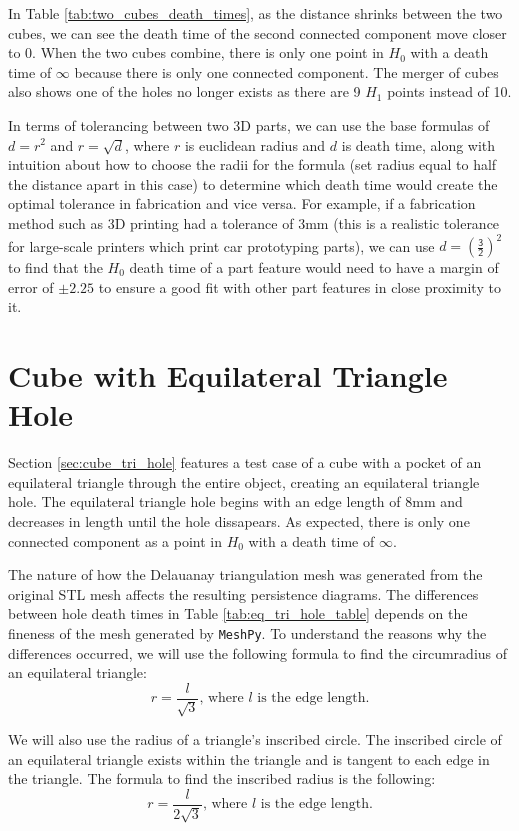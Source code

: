 \documentclass[ma]{uncgdissertationexp}
\theoremstyle{plain}
\theoremstyle{definition}
\theoremstyle{remark}
\begin{document}
\par In Table \ref{tab:two_cubes_death_times}, as the distance shrinks between the two cubes, we can see the death time of the second connected component move closer to 0. When the two cubes combine, there is only one point in $H_{0}$ with a death time of $\infty$ because there is only one connected component. The merger of cubes also shows one of the holes no longer exists as there are 9 $H_{1}$ points instead of 10.
\par In terms of tolerancing between two 3D parts, we can use the base formulas of $d=r^{2}$ and $r=\sqrt{d}$, where $r$ is euclidean radius and $d$ is death time, along with intuition about how to choose the radii for the formula (set radius equal to half the distance apart in this case) to determine which death time would create the optimal tolerance in fabrication and vice versa. For example, if a fabrication method such as 3D printing had a tolerance of 3mm (this is a realistic tolerance for large-scale printers which print car prototyping parts), we can use $d=(\mathsf{\frac{3}{2}})^{2}$ to find that the $H_{0}$ death time of a part feature would need to have a margin of error of $\pm 2.25$ to ensure a good fit with other part features in close proximity to it.
\newpage
\section{Cube with Equilateral Triangle Hole}
\label{sec:eq_tri_hole}
\par Section \ref{sec:cube_tri_hole} features a test case of a cube with a pocket of an equilateral triangle through the entire object, creating an equilateral triangle hole. The equilateral triangle hole begins with an edge length of 8mm and decreases in length until the hole dissapears. As expected, there is only one connected component as a point in $H_{0}$ with a death time of $\infty$.
\par The nature of how the Delauanay triangulation mesh was generated from the original STL mesh affects the resulting persistence diagrams. The differences between hole death times in Table \ref{tab:eq_tri_hole_table} depends on the fineness of the mesh generated by \verb"MeshPy". To understand the reasons why the differences occurred, we will use the following formula to find the circumradius of an equilateral triangle: 
$$r = \frac{l}{\sqrt{3}}\text{, where }l\text{ is the edge length.}$$

We will also use the radius of a triangle's inscribed circle. The inscribed circle of an equilateral triangle exists within the triangle and is tangent to each edge in the triangle. The formula to find the inscribed radius is the following:
$$r = \frac{l}{2\sqrt{3}}\text{, where }l\text{ is the edge length.}$$
\end{document}
